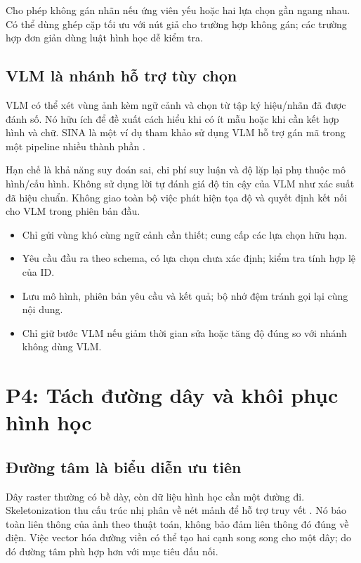 \documentclass[11pt,a4paper]{article}
\begin{document}
Cho phép không gán nhãn nếu ứng viên yếu hoặc hai lựa chọn gần ngang nhau. Có thể dùng ghép cặp tối ưu với nút giả cho trường hợp không gán; các trường hợp đơn giản dùng luật hình học dễ kiểm tra.

\subsection{VLM là nhánh hỗ trợ tùy chọn}
VLM có thể xét vùng ảnh kèm ngữ cảnh và chọn từ tập ký hiệu/nhãn đã được đánh số. Nó hữu ích để đề xuất cách hiểu khi có ít mẫu hoặc khi cần kết hợp hình và chữ. SINA là một ví dụ tham khảo sử dụng VLM hỗ trợ gán mã trong một pipeline nhiều thành phần \cite{sina}.

Hạn chế là khả năng suy đoán sai, chi phí suy luận và độ lặp lại phụ thuộc mô hình/cấu hình. Không sử dụng lời tự đánh giá độ tin cậy của VLM như xác suất đã hiệu chuẩn. Không giao toàn bộ việc phát hiện tọa độ và quyết định kết nối cho VLM trong phiên bản đầu.

\begin{itemize}
\item Chỉ gửi vùng khó cùng ngữ cảnh cần thiết; cung cấp các lựa chọn hữu hạn.
\item Yêu cầu đầu ra theo schema, có lựa chọn chưa xác định; kiểm tra tính hợp lệ của ID.
\item Lưu mô hình, phiên bản yêu cầu và kết quả; bộ nhớ đệm tránh gọi lại cùng nội dung.
\item Chỉ giữ bước VLM nếu giảm thời gian sửa hoặc tăng độ đúng so với nhánh không dùng VLM.
\end{itemize}

\clearpage
\section{P4: Tách đường dây và khôi phục hình học}
\subsection{Đường tâm là biểu diễn ưu tiên}
Dây raster thường có bề dày, còn dữ liệu hình học cần một đường đi. Skeletonization thu cấu trúc nhị phân về nét mảnh để hỗ trợ truy vết \cite{skeleton}. Nó bảo toàn liên thông của ảnh theo thuật toán, không bảo đảm liên thông đó đúng về điện. Việc vector hóa đường viền có thể tạo hai cạnh song song cho một dây; do đó đường tâm phù hợp hơn với mục tiêu đấu nối.
\end{document}
